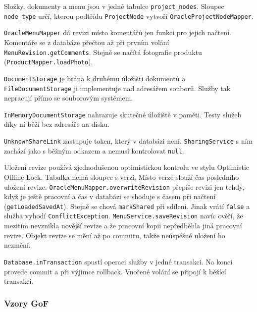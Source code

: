 \begin{description}[itemsep=2pt,style=unboxed]
  \item[Single Table Inheritance] Složky, dokumenty a menu jsou v jedné tabulce \texttt{project\_nodes}. Sloupec \texttt{node\_type} určí, kterou podtřídu \texttt{ProjectNode} vytvoří \texttt{OracleProjectNodeMapper}.
  \item[Lazy Load] \texttt{OracleMenuMapper} dá revizi místo komentářů jen funkci pro jejich načtení. Komentáře se z databáze přečtou až při prvním volání \texttt{MenuRevision.getComments}. Stejně se načítá fotografie produktu (\texttt{ProductMapper.loadPhoto}).
  \item[Gateway] \texttt{DocumentStorage} je brána k druhému úložišti dokumentů a \texttt{FileDocumentStorage} ji implementuje nad adresářem souborů. Služby tak nepracují přímo se souborovým systémem.
  \item[Service Stub] \texttt{InMemoryDocumentStorage} nahrazuje skutečné úložiště v paměti. Testy služeb díky ní běží bez adresáře na disku.
  \item[Special Case] \texttt{UnknownShareLink} zastupuje token, který v databázi není. \texttt{SharingService} s ním zachází jako s běžným odkazem a nemusí kontrolovat \texttt{null}.
  \item[Kontrola souběžné změny] Uložení revize používá zjednodušenou optimistickou kontrolu ve stylu Optimistic Offline Lock. Tabulka nemá sloupec s verzí. Místo verze slouží čas posledního uložení revize. \texttt{OracleMenuMapper.overwriteRevision} přepíše revizi jen tehdy, když je ještě pracovní a čas v databázi se shoduje s časem při načtení (\texttt{getLoadedSavedAt}). Stejně se chová \texttt{markShared} při sdílení. Jinak vrátí \texttt{false} a služba vyhodí \texttt{ConflictException}. \texttt{MenuService.saveRevision} navíc ověří, že mezitím nevznikla novější revize a že pracovní kopii nepředběhla jiná pracovní revize. Objekt revize se mění až po commitu, takže neúspěšné uložení ho nezmění.
  \item[Transaction] \texttt{Database.inTransaction} spustí operaci služby v jedné transakci. Na konci provede commit a při výjimce rollback. Vnořené volání se připojí k běžící transakci.
\end{description}

\subsubsection*{Vzory GoF}

